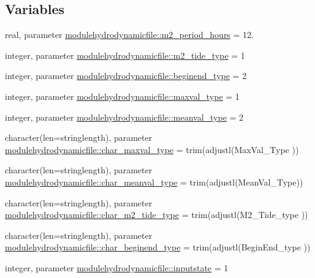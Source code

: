 \subsection*{Variables}
\begin{DoxyCompactItemize}
\item 
real, parameter \mbox{\hyperlink{namespacemodulehydrodynamicfile_ae01cf90e643c22027a057b444138753b}{modulehydrodynamicfile\+::m2\+\_\+period\+\_\+hours}} = 12.
\item 
integer, parameter \mbox{\hyperlink{namespacemodulehydrodynamicfile_a34497a0e115516f18a0e5835e6072fdb}{modulehydrodynamicfile\+::m2\+\_\+tide\+\_\+type}} = 1
\item 
integer, parameter \mbox{\hyperlink{namespacemodulehydrodynamicfile_a54c91753549bee1b5964361ce467d536}{modulehydrodynamicfile\+::beginend\+\_\+type}} = 2
\item 
integer, parameter \mbox{\hyperlink{namespacemodulehydrodynamicfile_a37f925874c5f4013567b353d89ce110d}{modulehydrodynamicfile\+::maxval\+\_\+type}} = 1
\item 
integer, parameter \mbox{\hyperlink{namespacemodulehydrodynamicfile_a9116232af616dc414e2af54862c61ea5}{modulehydrodynamicfile\+::meanval\+\_\+type}} = 2
\item 
character(len=stringlength), parameter \mbox{\hyperlink{namespacemodulehydrodynamicfile_af357c98f7d7ca01c0c68275368f80edb}{modulehydrodynamicfile\+::char\+\_\+maxval\+\_\+type}} = trim(adjustl(\textquotesingle{}Max\+Val\+\_\+\+Type\textquotesingle{} ))
\item 
character(len=stringlength), parameter \mbox{\hyperlink{namespacemodulehydrodynamicfile_ab74c3b9dea734eb31f28429eab24ea51}{modulehydrodynamicfile\+::char\+\_\+meanval\+\_\+type}} = trim(adjustl(\textquotesingle{}Mean\+Val\+\_\+\+Type\textquotesingle{}))
\item 
character(len=stringlength), parameter \mbox{\hyperlink{namespacemodulehydrodynamicfile_a861e2e3a8faba8b37911851568417e41}{modulehydrodynamicfile\+::char\+\_\+m2\+\_\+tide\+\_\+type}} = trim(adjustl(\textquotesingle{}M2\+\_\+\+Tide\+\_\+type\textquotesingle{} ))
\item 
character(len=stringlength), parameter \mbox{\hyperlink{namespacemodulehydrodynamicfile_a50d35586cf8d8931655ba77b057633f7}{modulehydrodynamicfile\+::char\+\_\+beginend\+\_\+type}} = trim(adjustl(\textquotesingle{}Begin\+End\+\_\+type\textquotesingle{} ))
\item 
integer, parameter \mbox{\hyperlink{namespacemodulehydrodynamicfile_a5ad2570e6e662bc5c287fbfba9d01d66}{modulehydrodynamicfile\+::inputstate}} = 1

\end{DoxyCompactItemize}
